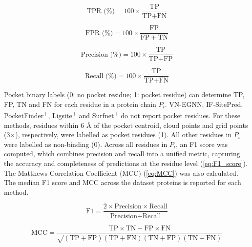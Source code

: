 \begin{equation}
\text{TPR (\%)} = 100 \times \frac{\text{TP}}{\text{TP} + \text{FN}}
\label{eq:TPR}
\end{equation}

\begin{equation}
\text{FPR (\%)} = 100 \times \frac{\mathrm{FP}}{\mathrm{FP} + \mathrm{TN}}
\label{eq:FPR}
\end{equation}

\begin{equation}
\text{Precision (\%)} = 100 \times \frac{\text{TP}}{\text{TP} + \text{FP}}
\label{eq:precision}
\end{equation}

\begin{equation}
\text{Recall (\%)} = 100 \times \frac{\text{TP}}{\text{TP} + \text{FN}}
\label{eq:recall}
\end{equation}

Pocket binary labels (0: no pocket residue; 1: pocket residue) can determine TP, FP, TN and FN for each residue in a protein chain $P_i$. VN-EGNN, IF-SitePred, PocketFinder\textsuperscript{+}, Ligsite\textsuperscript{+} and Surfnet\textsuperscript{+} do not report pocket residues. For these methods, residues within 6 \AA{} of the pocket centroid, cloud points and grid points (3$\times$), respectively, were labelled as pocket residues (1). All other residues in $P_i$ were labelled as non-binding (0). Across all residues in $P_i$, an F1 score was computed, which combines precision and recall into a unified metric, capturing the accuracy and completeness of predictions at the residue level (\autoref{eq:F1_score}). The Matthews Correlation Coefficient (MCC) \cite{MATTHEWS_1975_MCC} (\autoref{eq:MCC}) was also calculated. The median F1 score and MCC across the dataset proteins is reported for each method.

\begin{equation}
\text{F1} = \frac{2 \times \text{Precision} \times \text{Recall}}{\text{Precision} + \text{Recall}}
\label{eq:F1_score}
\end{equation}

\begin{equation}
\text{MCC} = \frac{\text{TP} \times \text{TN} - \text{FP} \times \text{FN}}{\sqrt{(\text{TP} + \text{FP})(\text{TP} + \text{FN})(\text{TN} + \text{FP})(\text{TN} + \text{FN})}}
\label{eq:MCC}
\end{equation}

